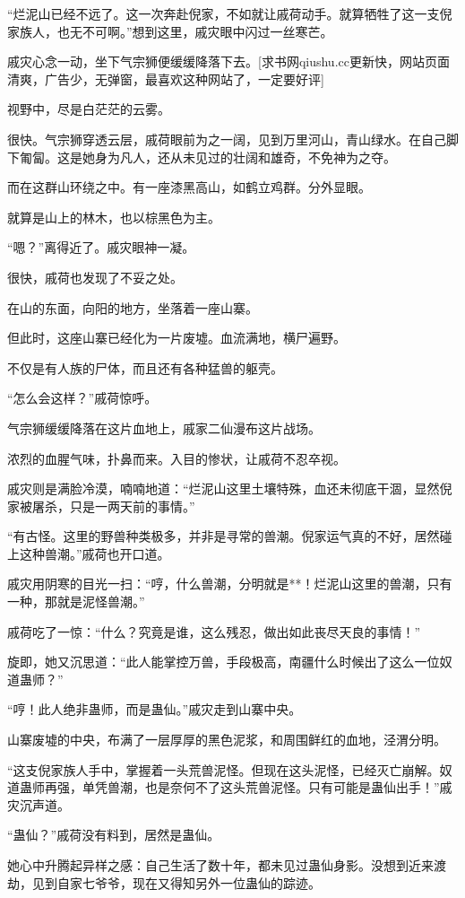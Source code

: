 \begin{this_body}
“烂泥山已经不远了。这一次奔赴倪家，不如就让戚荷动手。就算牺牲了这一支倪家族人，也无不可啊。”想到这里，戚灾眼中闪过一丝寒芒。

戚灾心念一动，坐下气宗狮便缓缓降落下去。[求书网qiushu.cc更新快，网站页面清爽，广告少，无弹窗，最喜欢这种网站了，一定要好评]

视野中，尽是白茫茫的云雾。

很快。气宗狮穿透云层，戚荷眼前为之一阔，见到万里河山，青山绿水。在自己脚下匍匐。这是她身为凡人，还从未见过的壮阔和雄奇，不免神为之夺。

而在这群山环绕之中。有一座漆黑高山，如鹤立鸡群。分外显眼。

就算是山上的林木，也以棕黑色为主。

“嗯？”离得近了。戚灾眼神一凝。

很快，戚荷也发现了不妥之处。

在山的东面，向阳的地方，坐落着一座山寨。

但此时，这座山寨已经化为一片废墟。血流满地，横尸遍野。

不仅是有人族的尸体，而且还有各种猛兽的躯壳。

“怎么会这样？”戚荷惊呼。

气宗狮缓缓降落在这片血地上，戚家二仙漫布这片战场。

浓烈的血腥气味，扑鼻而来。入目的惨状，让戚荷不忍卒视。

戚灾则是满脸冷漠，喃喃地道：“烂泥山这里土壤特殊，血还未彻底干涸，显然倪家被屠杀，只是一两天前的事情。”

“有古怪。这里的野兽种类极多，并非是寻常的兽潮。倪家运气真的不好，居然碰上这种兽潮。”戚荷也开口道。

戚灾用阴寒的目光一扫：“哼，什么兽潮，分明就是**！烂泥山这里的兽潮，只有一种，那就是泥怪兽潮。”

戚荷吃了一惊：“什么？究竟是谁，这么残忍，做出如此丧尽天良的事情！”

旋即，她又沉思道：“此人能掌控万兽，手段极高，南疆什么时候出了这么一位奴道蛊师？”

“哼！此人绝非蛊师，而是蛊仙。”戚灾走到山寨中央。

山寨废墟的中央，布满了一层厚厚的黑色泥浆，和周围鲜红的血地，泾渭分明。

“这支倪家族人手中，掌握着一头荒兽泥怪。但现在这头泥怪，已经灭亡崩解。奴道蛊师再强，单凭兽潮，也是奈何不了这头荒兽泥怪。只有可能是蛊仙出手！”戚灾沉声道。

“蛊仙？”戚荷没有料到，居然是蛊仙。

她心中升腾起异样之感：自己生活了数十年，都未见过蛊仙身影。没想到近来渡劫，见到自家七爷爷，现在又得知另外一位蛊仙的踪迹。


\end{this_body}
